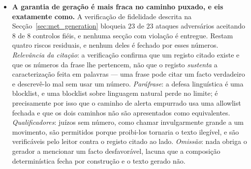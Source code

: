 \begin{itemize}
        A explicação mais provável não é que o modelo esteja avariado mas que seja
        \emph{redundante}. A materialidade entre as decisões registadas corre a $0.626$ contra uma
        prevalência de treino de $0.378$, porque só se registam decisões para manchetes que já
        passaram os filtros de relevância e frescura. Essas etapas baratas a montante já removeram a
        maior parte do que a etapa aprendida foi treinada para remover, deixando-lhe pouco para
        separar. Isto é uma lição geral sobre colocar um componente aprendido dentro de uma pipeline
        e não um defeito do componente: um modelo avaliado isoladamente e implantado atrás de
        filtros não é avaliado sobre a distribuição que vai ver. O resultado offline do
        Capítulo~\ref{chap:casestudies} mantém-se como resultado de conjunto de avaliação; o gate
        implantado não ganhou o seu lugar com esta evidência, e dizê-lo é mais barato do que
        defendê-lo.
  \item \textbf{A garantia de geração é mais fraca no caminho puxado, e eis exatamente como.}
        A verificação de fidelidade descrita na Secção~\ref{sec:met_generation} bloqueia $23$ de $23$
        ataques adversários aceitando $8$ de $8$ controlos fiéis, e nenhuma secção com violação é
        entregue. Restam quatro riscos residuais, e nenhum deles é fechado por esses números.
        \emph{Relevância da citação}: a verificação confirma que um registo citado existe e que os
        números da frase lhe pertencem, não que o registo \emph{sustenta} a caracterização feita em
        palavras --- uma frase pode citar um facto verdadeiro e descrevê-lo mal sem usar um número.
        \emph{Paráfrase}: a defesa linguística é uma blocklist, e uma blocklist sobre linguagem
        natural perde no limite; é precisamente por isso que o caminho de alerta empurrado usa uma
        allowlist fechada e que os dois caminhos não são apresentados como equivalentes.
        \emph{Qualificadores}: juízos sem número, como chamar invulgarmente grande a um movimento,
        são permitidos porque proibi-los tornaria o texto ilegível, e são verificáveis pelo leitor
        contra o registo citado ao lado. \emph{Omissão}: nada obriga o gerador a mencionar um facto
        desfavorável, lacuna que a composição determinística fecha por construção e o texto gerado
        não.


\end{itemize}
